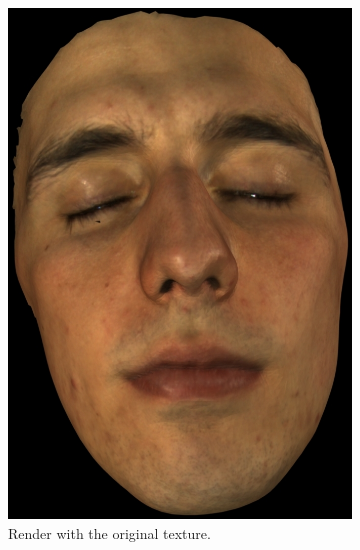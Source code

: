 \documentclass[11pt]{report}
\begin{document}
\begin{figure}
        \centering
        \begin{subfigure}[t]{0.48\textwidth}
                \includegraphics[width=\textwidth]{img/richard_original}
                \caption{Render with the original texture.}
                \label{fig:richard_original}
        \end{subfigure}
        \begin{subfigure}[t]{0.48\textwidth}

\end{subfigure}
\end{figure}
\end{document}
